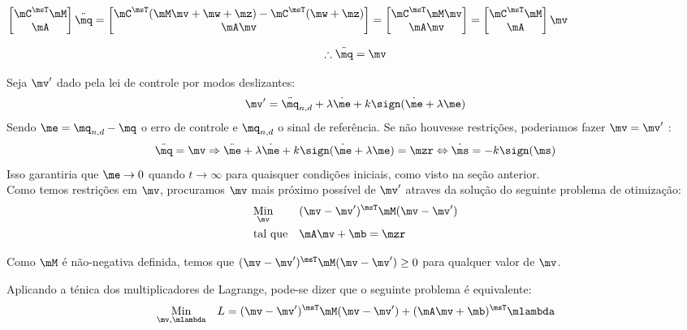 $ \begin{bmatrix}
\mC^\msT \mM \\
\mA
\end{bmatrix}
\ddot{\mq}
=
\begin{bmatrix}
\mC^\msT ( \mM \mv + \mw + \mz ) - \mC^\msT(\mw + \mz) \\
\mA \mv
\end{bmatrix}
=
\begin{bmatrix}
\mC^\msT  \mM \mv \\
\mA \mv
\end{bmatrix}
=
\begin{bmatrix}
\mC^\msT \mM \\
\mA
\end{bmatrix}
\mv $

\begin{equation} \label{eq:ClosedLoopV}
\therefore \ddot{\mq} = \mv
\end{equation}

Seja $\mv'$ dado pela lei de controle por modos deslizantes:
\begin{equation} \label{eq:SMControlowLasV1'}
\mv' = \ddot{\mq}_{n, d} + \lambda \dot{\me} + k \sign (\dot{\me} + \lambda \me)
\end{equation}
Sendo $ \me = \mq_{n,d} - \mq $ o erro de controle e $\mq_{n,d}$ o sinal de refer\^encia. Se n\~ao houvesse restri\c{c}\~oes, poderiamos fazer $ \mv = \mv' $ :
$$ \ddot{\mq} = \mv \Rightarrow  \ddot{\me} + \lambda \dot{\me} + k \sign (\dot{\me} + \lambda \me) = \mzr \Leftrightarrow \dot{\ms} = - k \sign(\ms)$$
Isso garantiria que $\me \rightarrow 0$ quando $t \rightarrow \infty$ para quaisquer condi\c{c}\~oes iniciais, como visto na se\c{c}\~ao anterior. \\

Como temos restri\c{c}\~oes em $\mv$, procuramos $\mv$ mais pr\'oximo poss\'ivel de $\mv'$ atraves da solu\c{c}\~ao do seguinte problema de otimiza\c{c}\~ao:
\begin{equation} \label{eq:Optimization}
\begin{aligned}
& \underset{\mv}{\text{Min}}
& & (\mv - \mv')^\msT \mM (\mv - \mv') \\
& \text{tal que}
& & \mA \mv + \mb = \mzr
\end{aligned}
\end{equation}

Como $\mM$ \'e n\~ao-negativa definida, temos que $(\mv - \mv')^\msT \mM (\mv - \mv') \geq 0 $ para qualquer valor de $\mv$.

Aplicando a t\'enica dos multiplicadores de Lagrange, pode-se dizer que o seguinte problema \'e equivalente:
\begin{equation}
\begin{aligned}
& \underset{\mv, \mlambda}{\text{Min}}
& & L = (\mv - \mv')^\msT \mM (\mv - \mv') + (\mA \mv + \mb)^\msT \mlambda \\
\end{aligned}
\end{equation}


